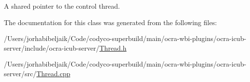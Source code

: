 A shared pointer to the control thread. 

The documentation for this class was generated from the following files\+:\begin{DoxyCompactItemize}
\item 
/\+Users/jorhabibeljaik/\+Code/codyco-\/superbuild/main/ocra-\/wbi-\/plugins/ocra-\/icub-\/server/include/ocra-\/icub-\/server/\hyperlink{Thread_8h}{Thread.\+h}\item 
/\+Users/jorhabibeljaik/\+Code/codyco-\/superbuild/main/ocra-\/wbi-\/plugins/ocra-\/icub-\/server/src/\hyperlink{Thread_8cpp}{Thread.\+cpp}\end{DoxyCompactItemize}

